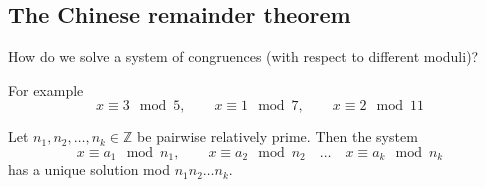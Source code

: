 \documentclass[english]{lbscript}
\begin{document}
\subsection{The Chinese remainder theorem}
\label{sec:chin-rema-theor}

How do we solve a system of congruences (with respect to different moduli)?

For example
\begin{equation}
	\label{eq:119}
	x≡3 \mod 5, \quad\quad  x≡1 \mod 7, \quad\quad x≡2 \mod 11
\end{equation}

\begin{theorem}{}{}
	Let \(n_1,n_2, \dots, n_k∈ℤ\) be pairwise relatively prime. Then the system
	\begin{equation}
		\label{eq:120}
		x≡a_1\mod n_1, \quad \quad x≡a_2 \mod n_2\quad  \dots\quad x≡a_k \mod n_k
	\end{equation}
	has a unique solution mod \(n_1n_2\dots n_k\).
\end{theorem}
\end{document}
